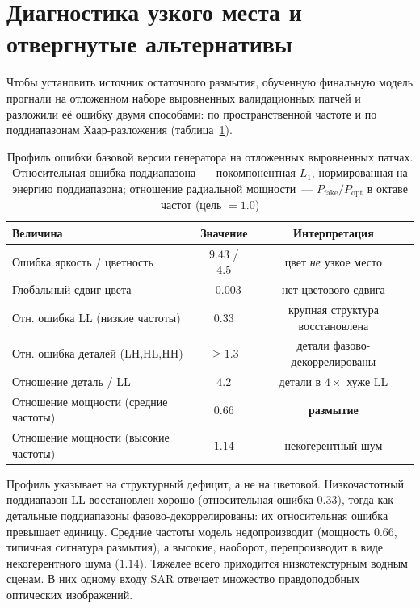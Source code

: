 \section{Диагностика узкого места и отвергнутые альтернативы}
\label{sec:negative}

Чтобы установить источник остаточного размытия, обученную финальную модель
прогнали на отложенном наборе выровненных валидационных патчей и разложили её ошибку
двумя способами: по пространственной частоте и по поддиапазонам Хаар-разложения
(таблица~\ref{tab:errorprofile}).

\begin{table}[H]
  \centering
  \caption{Профиль ошибки базовой версии генератора на отложенных выровненных
           патчах. Относительная ошибка поддиапазона~--- покомпонентная $L_{1}$,
           нормированная на энергию поддиапазона; отношение радиальной мощности~---
           $P_{\text{fake}}/P_{\text{opt}}$ в октаве частот (цель $=1.0$)}
  \label{tab:errorprofile}
  \begin{tabular}{lcc}
    \toprule
    Величина & Значение & Интерпретация \\
    \midrule
    Ошибка яркость / цветность      & $9.43$ / $4.5$ & цвет \emph{не} узкое место \\
    Глобальный сдвиг цвета          & $-0.003$ & нет цветового сдвига \\
    Отн. ошибка LL (низкие частоты) & $0.33$ & крупная структура восстановлена \\
    Отн. ошибка деталей (LH,HL,HH)  & $\geq 1.3$ & детали фазово-декоррелированы \\
    Отношение деталь / LL           & $4.2$ & детали в $4\times$ хуже LL \\
    Отношение мощности (средние частоты) & $0.66$ & \textbf{размытие} \\
    Отношение мощности (высокие частоты) & $1.14$ & некогерентный шум \\
    \bottomrule
  \end{tabular}
\end{table}

Профиль указывает на структурный дефицит, а не на цветовой. Низкочастотный
поддиапазон LL восстановлен хорошо (относительная ошибка $0.33$), тогда как
детальные поддиапазоны фазово-декоррелированы: их относительная ошибка превышает
единицу. Средние частоты модель недопроизводит (мощность $0.66$, типичная
сигнатура размытия), а высокие, наоборот, перепроизводит в виде некогерентного
шума ($1.14$). Тяжелее всего приходится низкотекстурным водным сценам. В них одному
входу SAR отвечает множество правдоподобных оптических изображений.


